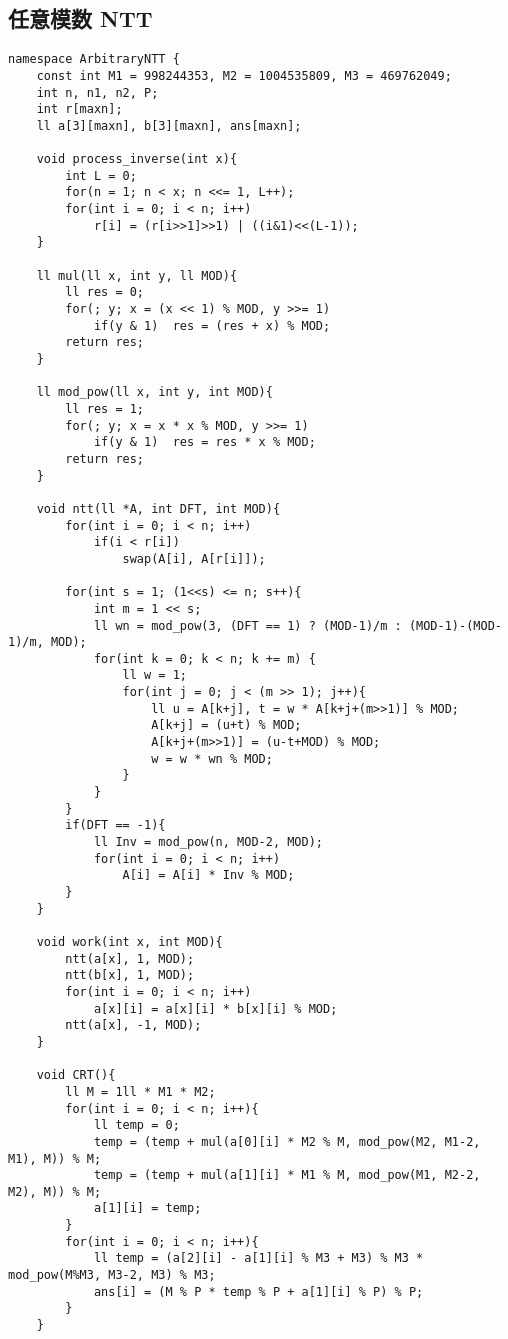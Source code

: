 \subsection{任意模数 NTT}

\begin{verbatim}
namespace ArbitraryNTT {
    const int M1 = 998244353, M2 = 1004535809, M3 = 469762049;  
    int n, n1, n2, P;  
    int r[maxn];  
    ll a[3][maxn], b[3][maxn], ans[maxn];  
    
    void process_inverse(int x){  
        int L = 0;  
        for(n = 1; n < x; n <<= 1, L++);    
        for(int i = 0; i < n; i++)  
            r[i] = (r[i>>1]>>1) | ((i&1)<<(L-1));  
    }  
    
    ll mul(ll x, int y, ll MOD){  
        ll res = 0;  
        for(; y; x = (x << 1) % MOD, y >>= 1)  
            if(y & 1)  res = (res + x) % MOD;  
        return res;  
    }  
    
    ll mod_pow(ll x, int y, int MOD){  
        ll res = 1;  
        for(; y; x = x * x % MOD, y >>= 1)  
            if(y & 1)  res = res * x % MOD;  
        return res;  
    }  
    
    void ntt(ll *A, int DFT, int MOD){  
        for(int i = 0; i < n; i++)  
            if(i < r[i])  
                swap(A[i], A[r[i]]);  
    
        for(int s = 1; (1<<s) <= n; s++){  
            int m = 1 << s;  
            ll wn = mod_pow(3, (DFT == 1) ? (MOD-1)/m : (MOD-1)-(MOD-1)/m, MOD);  
            for(int k = 0; k < n; k += m) {  
                ll w = 1;  
                for(int j = 0; j < (m >> 1); j++){  
                    ll u = A[k+j], t = w * A[k+j+(m>>1)] % MOD;  
                    A[k+j] = (u+t) % MOD;  
                    A[k+j+(m>>1)] = (u-t+MOD) % MOD;  
                    w = w * wn % MOD;  
                }  
            }  
        }  
        if(DFT == -1){  
            ll Inv = mod_pow(n, MOD-2, MOD);  
            for(int i = 0; i < n; i++)   
                A[i] = A[i] * Inv % MOD;  
        }  
    }  
    
    void work(int x, int MOD){  
        ntt(a[x], 1, MOD);  
        ntt(b[x], 1, MOD);  
        for(int i = 0; i < n; i++)  
            a[x][i] = a[x][i] * b[x][i] % MOD;  
        ntt(a[x], -1, MOD);  
    }  
    
    void CRT(){  
        ll M = 1ll * M1 * M2;  
        for(int i = 0; i < n; i++){  
            ll temp = 0;  
            temp = (temp + mul(a[0][i] * M2 % M, mod_pow(M2, M1-2, M1), M)) % M;  
            temp = (temp + mul(a[1][i] * M1 % M, mod_pow(M1, M2-2, M2), M)) % M;  
            a[1][i] = temp;  
        }  
        for(int i = 0; i < n; i++){  
            ll temp = (a[2][i] - a[1][i] % M3 + M3) % M3 * mod_pow(M%M3, M3-2, M3) % M3;  
            ans[i] = (M % P * temp % P + a[1][i] % P) % P;  
        }  
    }  
    

\end{verbatim}
